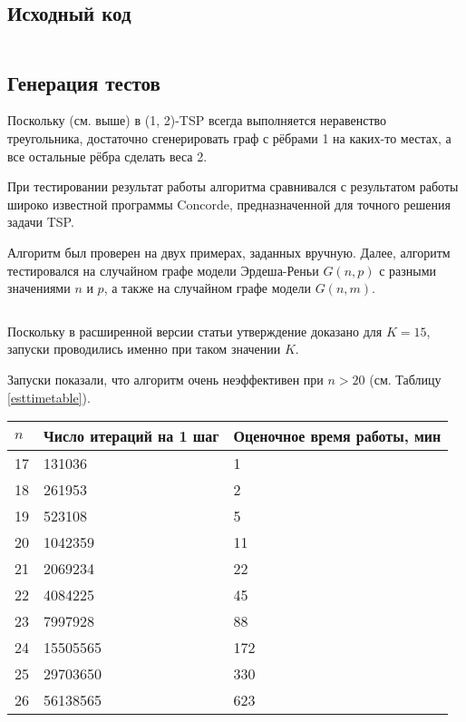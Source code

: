 \subsection{Исходный код}
\inputminted{python}{k-improv.py}
\subsection{Генерация тестов}
Поскольку (см. выше) в (1, 2)-TSP всегда выполняется неравенство треугольника, достаточно сгенерировать граф с рёбрами 1 на каких-то местах, а все остальные рёбра сделать веса 2.

При тестировании результат работы алгоритма сравнивался с результатом работы широко известной программы Concorde, предназначенной для точного решения задачи TSP.

Алгоритм был проверен на двух примерах, заданных вручную. Далее, алгоритм тестировался на случайном графе модели Эрдеша-Реньи $G(n, p)$ с разными значениями $n$ и $p$, а также на случайном графе модели $G(n, m)$.

\inputminted{python}{erdos-renyi.py}

Поскольку в расширенной версии статьи утверждение доказано для $K=15$, запуски проводились именно при таком значении $K$.

Запуски показали, что алгоритм очень неэффективен при $n>20$ (см. Таблицу \ref{esttimetable}).

\begin{center}
\begin{tabular}{|l|l|l|}
\hline
$n$ & Число итераций на 1 шаг & Оценочное время работы, мин \\ \hline
17 & 131036 & 1\\ \hline
18 & 261953 & 2\\ \hline
19 & 523108 & 5\\ \hline
20 & 1042359 & 11\\ \hline
21 & 2069234 & 22\\ \hline
22 & 4084225 & 45\\ \hline
23 & 7997928 & 88\\ \hline
24 & 15505565 & 172\\ \hline
25 & 29703650 & 330\\ \hline
26 & 56138565 & 623\\ \hline
\end{tabular}
 \label{esttimetable}
\end{center}



